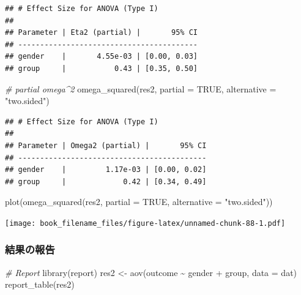 \documentclass[
  ja=standard, xelatex, base=12pt]{bxjsreport}
\newenvironment{Shaded}{\begin{snugshade}}{\end{snugshade}}
\newcommand{\AttributeTok}[1]{\textcolor[rgb]{0.77,0.63,0.00}{#1}}
\newcommand{\CommentTok}[1]{\textcolor[rgb]{0.56,0.35,0.01}{\textit{#1}}}
\newcommand{\ConstantTok}[1]{\textcolor[rgb]{0.00,0.00,0.00}{#1}}
\newcommand{\FunctionTok}[1]{\textcolor[rgb]{0.00,0.00,0.00}{#1}}
\newcommand{\NormalTok}[1]{#1}
\newcommand{\OtherTok}[1]{\textcolor[rgb]{0.56,0.35,0.01}{#1}}
\newcommand{\SpecialCharTok}[1]{\textcolor[rgb]{0.00,0.00,0.00}{#1}}
\newcommand{\StringTok}[1]{\textcolor[rgb]{0.31,0.60,0.02}{#1}}
\begin{document}
\begin{verbatim}
## # Effect Size for ANOVA (Type I)
## 
## Parameter | Eta2 (partial) |       95% CI
## -----------------------------------------
## gender    |       4.55e-03 | [0.00, 0.03]
## group     |           0.43 | [0.35, 0.50]
\end{verbatim}

\begin{Shaded}
\begin{Highlighting}[]
\CommentTok{\# partial omega\^{}2}
\FunctionTok{omega\_squared}\NormalTok{(res2, }\AttributeTok{partial =} \ConstantTok{TRUE}\NormalTok{, }\AttributeTok{alternative =} \StringTok{"two.sided"}\NormalTok{)}
\end{Highlighting}
\end{Shaded}

\begin{verbatim}
## # Effect Size for ANOVA (Type I)
## 
## Parameter | Omega2 (partial) |       95% CI
## -------------------------------------------
## gender    |         1.17e-03 | [0.00, 0.02]
## group     |             0.42 | [0.34, 0.49]
\end{verbatim}

\begin{Shaded}
\begin{Highlighting}[]
\FunctionTok{plot}\NormalTok{(}\FunctionTok{omega\_squared}\NormalTok{(res2, }\AttributeTok{partial =} \ConstantTok{TRUE}\NormalTok{, }\AttributeTok{alternative =} \StringTok{"two.sided"}\NormalTok{))}
\end{Highlighting}
\end{Shaded}

\texttt{[image: book\_filename\_files/figure-latex/unnamed-chunk-88-1.pdf]}

\hypertarget{ux7d50ux679cux306eux5831ux544a-5}{%
\subsubsection{結果の報告}\label{ux7d50ux679cux306eux5831ux544a-5}}

\begin{Shaded}
\begin{Highlighting}[]
\CommentTok{\# Report}
\FunctionTok{library}\NormalTok{(report)}
\NormalTok{res2 }\OtherTok{\textless{}{-}} \FunctionTok{aov}\NormalTok{(outcome }\SpecialCharTok{\textasciitilde{}}\NormalTok{ gender }\SpecialCharTok{+}\NormalTok{ group, }\AttributeTok{data =}\NormalTok{ dat)}
\FunctionTok{report\_table}\NormalTok{(res2)}
\end{Highlighting}
\end{Shaded}
\end{document}
